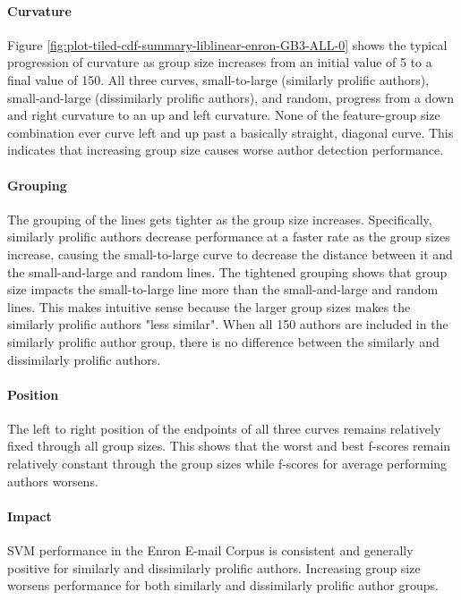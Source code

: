 	\paragraph*{Curvature}Figure \ref{fig:plot-tiled-cdf-summary-liblinear-enron-GB3-ALL-0} shows the typical progression of curvature as group size increases from an initial value of 5 to a final value of 150.  All three curves, small-to-large (similarly prolific authors), small-and-large (dissimilarly prolific authors), and random, progress from a down and right curvature to an up and left curvature.  None of the feature-group size combination ever curve left and up past a basically straight, diagonal curve.  This indicates that increasing group size causes worse author detection performance.
	\paragraph*{Grouping} The grouping of the lines gets tighter as the group size increases.  Specifically, similarly prolific authors decrease performance at a faster rate as the group sizes increase, causing the small-to-large curve to decrease the distance between it and the small-and-large and random lines.  The tightened grouping shows that group size impacts the small-to-large line more than the small-and-large and random lines.  This makes intuitive sense because the larger group sizes makes the similarly prolific authors "less similar".  When all 150 authors are included in the similarly prolific author group, there is no difference between the similarly and dissimilarly prolific authors.  
	\paragraph*{Position}The left to right position of the endpoints of all three curves remains relatively fixed through all group sizes.  This shows that the worst and best f-scores remain relatively constant through the group sizes while f-scores for average performing authors worsens.  
	\paragraph*{Impact} SVM performance in the Enron E-mail Corpus is consistent and generally positive for similarly and dissimilarly prolific authors.  Increasing group size worsens performance for both similarly and dissimilarly prolific author groups.
	
